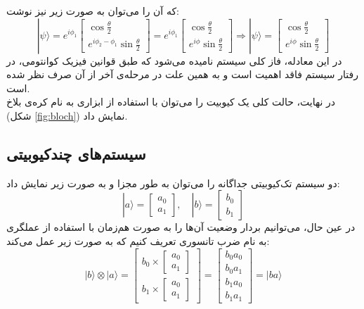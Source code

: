 که آن را می‌توان به صورت زیر نیز نوشت:
\begin{equation}
|\psi\rangle = e^{i\phi_1} \begin{bmatrix} \cos{\tfrac{\theta}{2}} \\[6pt] e^{i\phi_2-\phi_1}\sin{\tfrac{\theta}{2}} \end{bmatrix} = e^{i\phi_1} \begin{bmatrix} \cos{\tfrac{\theta}{2}} \\[6pt] e^{i\phi}\sin{\tfrac{\theta}{2}} \end{bmatrix}
\Rightarrow |\psi\rangle = \begin{bmatrix} \cos{\tfrac{\theta}{2}} \\[6pt] e^{i\phi}\sin{\tfrac{\theta}{2}} \end{bmatrix}
\end{equation}
در این معادله،
 فاز کلی سیستم نامیده می‌شود که طبق قوانین فیزیک کوانتومی، در رفتار سیستم فاقد اهمیت است و به همین علت در مرحله‌ی آخر از آن صرف نظر شده است. \\
در نهایت، حالت کلی یک کیوبیت را می‌توان با استفاده از ابزاری به نام کره‌ی بلاخ (شکل
\ref{fig:bloch})
نمایش داد.

\subsection{سیستم‌های چندکیوبیتی}
دو سیستم تک‌کیوبیتی جداگانه را می‌توان به طور مجزا و به صورت زیر نمایش داد:
\begin{equation}
|a\rangle = \begin{bmatrix} a_0 \\ a_1 \end{bmatrix}, \quad |b\rangle = \begin{bmatrix} b_0 \\ b_1 \end{bmatrix}
\end{equation}
در عین حال، می‌توانیم بردار وضعیت آن‌ها را به صورت هم‌زمان با استفاده از عملگری به نام ضرب تانسوری
تعریف کنیم که به صورت زیر عمل می‌کند:
\begin{equation}
|b\rangle \otimes |a\rangle = \begin{bmatrix} b_0 \times \begin{bmatrix} a_0 \\ a_1 \end{bmatrix} \\[12pt] b_1 \times \begin{bmatrix} a_0 \\ a_1 \end{bmatrix} \end{bmatrix} = \begin{bmatrix} b_0 a_0 \\[2pt] b_0 a_1 \\[2pt] b_1 a_0 \\[2pt] b_1 a_1 \end{bmatrix} = |ba\rangle
\end{equation}

